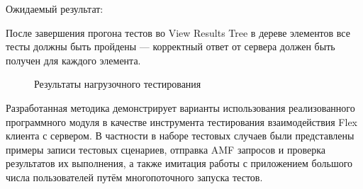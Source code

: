 Ожидаемый результат:

 После завершения прогона тестов во View Results Tree в дереве элементов все тесты должны быть пройдены ---
 корректный ответ от сервера должен быть получен для каждого элемента.

 \begin{figure}[ht]
\caption{Результаты нагрузочного тестирования}
\label{ris:load.png}
\end{figure}

Разработанная методика демонстрирует варианты использования реализованного программного модуля в
качестве инструмента тестирования взаимодействия Flex клиента с сервером. В частности в наборе
тестовых случаев были представлены примеры записи тестовых сценариев, отправка AMF запросов и
проверка результатов их выполнения, а также имитация работы с приложением большого числа пользователей
путём многопоточного запуска тестов.
















